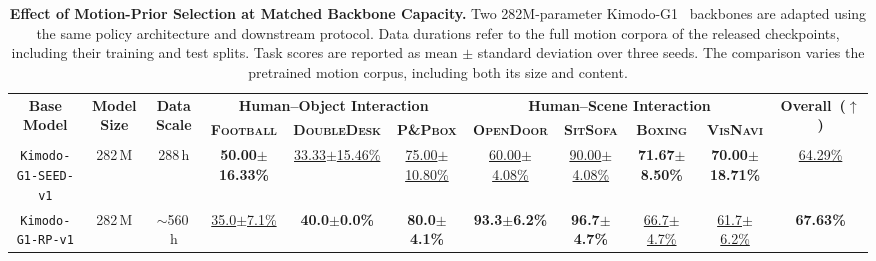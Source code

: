 \begin{table}[H]
  \caption{\textbf{Effect of Motion-Prior Selection at Matched Backbone Capacity.} Two 282M-parameter Kimodo-G1~\citep{kimodo} backbones are adapted using the same policy architecture and downstream protocol. Data durations refer to the full motion corpora of the released checkpoints, including their training and test splits. Task scores are reported as mean $\pm$ standard deviation over three seeds. The comparison varies the pretrained motion corpus, including both its size and content.}
  \label{tab:t2m_dependency}
  \centering
  \begin{adjustbox}{max width=\textwidth}
  \setlength{\tabcolsep}{3.8pt}
  \renewcommand{\arraystretch}{1.08}

  \begin{tabular}{cccccc|ccccc}
  \toprule
  \multirow{2}{*}{\textbf{Base Model}} &
  \multirow{2}{*}{\textbf{Model Size}} &
  \multirow{2}{*}{\textbf{Data Scale}} &
  \multicolumn{3}{c|}{\textbf{Human--Object Interaction}} &
  \multicolumn{4}{c}{\textbf{Human--Scene Interaction}} &
  \multirow{2}{*}{\textbf{Overall~($\uparrow$)}} \\
  \cmidrule(lr){4-6}
  \cmidrule(lr){7-10}

  & & &
  \textbf{\textsc{Football}} &
  \textbf{\textsc{DoubleDesk}} &
  \textbf{\textsc{P\&Pbox}} &
  \textbf{\textsc{OpenDoor}} &
  \textbf{\textsc{SitSofa}} &
  \textbf{\textsc{Boxing}} &
  \textbf{\textsc{VisNavi}} \\
  \midrule

  \texttt{Kimodo-G1-SEED-v1}
  & 282\,M
  & 288\,h
  & \textbf{50.00$\pm$16.33\%}
  & \underline{33.33$\pm$15.46\%}
  & \underline{75.00$\pm$10.80\%}
  & \underline{60.00$\pm$4.08\%}
  & \underline{90.00$\pm$4.08\%}
  & \textbf{71.67$\pm$8.50\%}
  & \textbf{70.00$\pm$18.71\%}
  & \underline{64.29\%} \\

  \rowcolor{hclbrown!8!white}
  \texttt{Kimodo-G1-RP-v1}
  & 282\,M
  & $\sim$560\,h
  & \underline{35.0$\pm$7.1\%}
  & \textbf{40.0$\pm$0.0\%}
  & \textbf{80.0$\pm$4.1\%}
  & \textbf{93.3$\pm$6.2\%}
  & \textbf{96.7$\pm$4.7\%}
  & \underline{66.7$\pm$4.7\%}
  & \underline{61.7$\pm$6.2\%}
  & \textbf{67.63\%} \\

  \bottomrule
  \end{tabular}
  \end{adjustbox}
\end{table}
